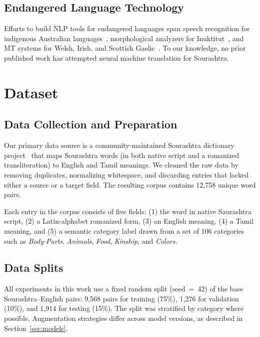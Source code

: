 \documentclass[conference]{IEEEtran}
\begin{document}
\subsection{Endangered Language Technology}

Efforts to build NLP tools for endangered languages span speech recognition for indigenous Australian languages~\cite{foley2018building}, morphological analyzers for Inuktitut~\cite{micher2017improving}, and MT systems for Welsh, Irish, and Scottish Gaelic~\cite{dowling2020smt}. To our knowledge, no prior published work has attempted neural machine translation for Sourashtra.

\section{Dataset}\label{sec:dataset}

\subsection{Data Collection and Preparation}

Our primary data source is a community-maintained Sourashtra dictionary project~\cite{sourashtra_dict} that maps Sourashtra words (in both native script and a romanized transliteration) to English and Tamil meanings. We cleaned the raw data by removing duplicates, normalizing whitespace, and discarding entries that lacked either a source or a target field. The resulting corpus contains 12,758 unique word pairs.

Each entry in the corpus consists of five fields: (1) the word in native Saurashtra script, (2) a Latin-alphabet romanized form, (3) an English meaning, (4) a Tamil meaning, and (5) a semantic category label drawn from a set of 106 categories such as \textit{Body-Parts}, \textit{Animals}, \textit{Food}, \textit{Kinship}, and \textit{Colors}.

\subsection{Data Splits}

All experiments in this work use a fixed random split (seed~=~42) of the base Sourashtra--English pairs: 9,568 pairs for training (75\%), 1,276 for validation (10\%), and 1,914 for testing (15\%). The split was stratified by category where possible. Augmentation strategies differ across model versions, as described in Section~\ref{sec:models}.
\end{document}
